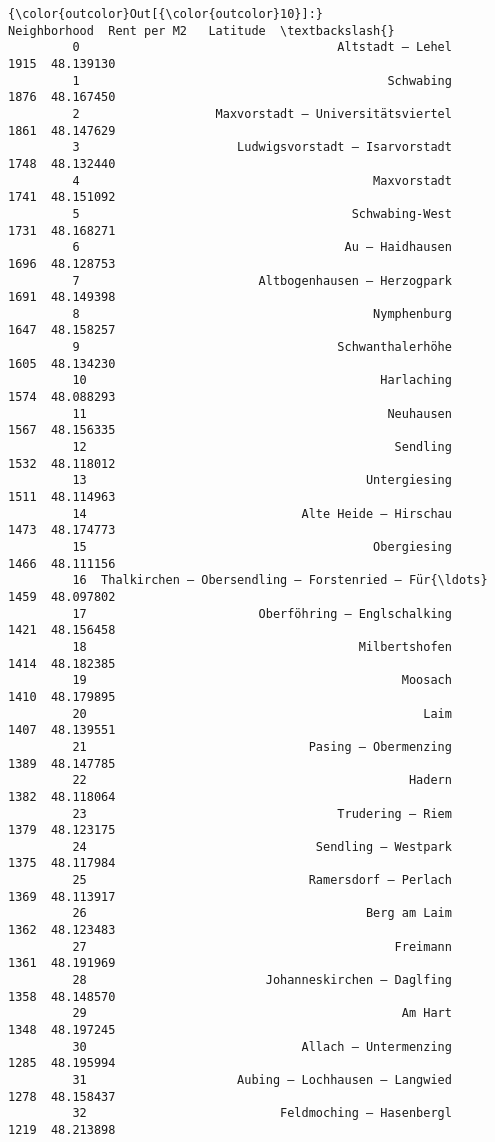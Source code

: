 \documentclass[11pt]{article}
\begin{document}
\begin{Verbatim}[commandchars=\\\{\}]
{\color{outcolor}Out[{\color{outcolor}10}]:}                                          Neighborhood  Rent per M2   Latitude  \textbackslash{}
         0                                    Altstadt – Lehel         1915  48.139130   
         1                                           Schwabing         1876  48.167450   
         2                   Maxvorstadt – Universitätsviertel         1861  48.147629   
         3                      Ludwigsvorstadt – Isarvorstadt         1748  48.132440   
         4                                         Maxvorstadt         1741  48.151092   
         5                                      Schwabing-West         1731  48.168271   
         6                                     Au – Haidhausen         1696  48.128753   
         7                         Altbogenhausen – Herzogpark         1691  48.149398   
         8                                         Nymphenburg         1647  48.158257   
         9                                    Schwanthalerhöhe         1605  48.134230   
         10                                         Harlaching         1574  48.088293   
         11                                          Neuhausen         1567  48.156335   
         12                                           Sendling         1532  48.118012   
         13                                       Untergiesing         1511  48.114963   
         14                              Alte Heide – Hirschau         1473  48.174773   
         15                                        Obergiesing         1466  48.111156   
         16  Thalkirchen – Obersendling – Forstenried – Für{\ldots}         1459  48.097802   
         17                        Oberföhring – Englschalking         1421  48.156458   
         18                                      Milbertshofen         1414  48.182385   
         19                                            Moosach         1410  48.179895   
         20                                               Laim         1407  48.139551   
         21                               Pasing – Obermenzing         1389  48.147785   
         22                                             Hadern         1382  48.118064   
         23                                   Trudering – Riem         1379  48.123175   
         24                                Sendling – Westpark         1375  48.117984   
         25                               Ramersdorf – Perlach         1369  48.113917   
         26                                       Berg am Laim         1362  48.123483   
         27                                           Freimann         1361  48.191969   
         28                         Johanneskirchen – Daglfing         1358  48.148570   
         29                                            Am Hart         1348  48.197245   
         30                              Allach – Untermenzing         1285  48.195994   
         31                     Aubing – Lochhausen – Langwied         1278  48.158437   
         32                           Feldmoching – Hasenbergl         1219  48.213898   
         

\end{Verbatim}
\end{document}
